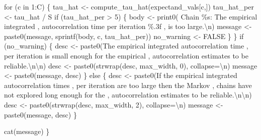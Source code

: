 \documentclass[
  letterpaper,
  DIV=11,
  numbers=noendperiod]{scrartcl}
\newenvironment{Shaded}{\begin{snugshade}}{\end{snugshade}}
\newcommand{\CharTok}[1]{\textcolor[rgb]{0.13,0.47,0.30}{#1}}
\newcommand{\ControlFlowTok}[1]{\textcolor[rgb]{0.00,0.23,0.31}{#1}}
\newcommand{\DecValTok}[1]{\textcolor[rgb]{0.68,0.00,0.00}{#1}}
\newcommand{\KeywordTok}[1]{\textcolor[rgb]{0.00,0.23,0.31}{#1}}
\newcommand{\NormalTok}[1]{\textcolor[rgb]{0.00,0.23,0.31}{#1}}
\newcommand{\OperatorTok}[1]{\textcolor[rgb]{0.37,0.37,0.37}{#1}}
\newcommand{\SpecialCharTok}[1]{\textcolor[rgb]{0.37,0.37,0.37}{#1}}
\newcommand{\StringTok}[1]{\textcolor[rgb]{0.13,0.47,0.30}{#1}}
\begin{document}
\begin{Shaded}
\begin{Highlighting}[]
  \ControlFlowTok{for}\NormalTok{ (c }\KeywordTok{in} \DecValTok{1}\NormalTok{:C) \{}
\NormalTok{    tau\_hat }\OperatorTok{\textless{}{-}}\NormalTok{ compute\_tau\_hat(expectand\_vals[c,])}
\NormalTok{    tau\_hat\_per }\OperatorTok{\textless{}{-}}\NormalTok{ tau\_hat }\OperatorTok{/}\NormalTok{ S}
    \ControlFlowTok{if}\NormalTok{ (tau\_hat\_per }\OperatorTok{\textgreater{}} \DecValTok{5}\NormalTok{) \{}
\NormalTok{      body }\OperatorTok{\textless{}{-}}\NormalTok{ print0(}\StringTok{\textquotesingle{}  Chain }\SpecialCharTok{\%s}\StringTok{: The empirical integrated \textquotesingle{}}\NormalTok{,}
                     \StringTok{\textquotesingle{}autocorrelation time per iteration }\SpecialCharTok{\%.3f}\StringTok{ \textquotesingle{}}\NormalTok{,}
                     \StringTok{\textquotesingle{}is too large.}\CharTok{\textbackslash{}n}\StringTok{\textquotesingle{}}\NormalTok{)}
\NormalTok{      message }\OperatorTok{\textless{}{-}}\NormalTok{ paste0(message, sprintf(body, c, tau\_hat\_per))}
\NormalTok{      no\_warning }\OperatorTok{\textless{}{-}}\NormalTok{ FALSE}
\NormalTok{    \}}
\NormalTok{  \}}
  \ControlFlowTok{if}\NormalTok{ (no\_warning) \{}
\NormalTok{    desc }\OperatorTok{\textless{}{-}}\NormalTok{ paste0(}\StringTok{\textquotesingle{}The empirical integrated autocorrelation time \textquotesingle{}}\NormalTok{,}
                   \StringTok{\textquotesingle{}per iteration is small enough for the empirical \textquotesingle{}}\NormalTok{,}
                   \StringTok{\textquotesingle{}autocorrelation estimates to be reliable.}\CharTok{\textbackslash{}n\textbackslash{}n}\StringTok{\textquotesingle{}}\NormalTok{)}
\NormalTok{    desc }\OperatorTok{\textless{}{-}}\NormalTok{ paste0(strwrap(desc, max\_width, }\DecValTok{0}\NormalTok{), collapse}\OperatorTok{=}\StringTok{\textquotesingle{}}\CharTok{\textbackslash{}n}\StringTok{\textquotesingle{}}\NormalTok{)}
\NormalTok{    message }\OperatorTok{\textless{}{-}}\NormalTok{ paste0(message, desc)}
\NormalTok{  \} }\ControlFlowTok{else}\NormalTok{ \{}
\NormalTok{    desc }\OperatorTok{\textless{}{-}}\NormalTok{ paste0(}\StringTok{\textquotesingle{}If the empirical integrated autocorrelation times \textquotesingle{}}\NormalTok{,}
                   \StringTok{\textquotesingle{}per iteration are too large then the Markov \textquotesingle{}}\NormalTok{,}
                   \StringTok{\textquotesingle{}chains have not explored long enough for the \textquotesingle{}}\NormalTok{,}
                   \StringTok{\textquotesingle{}autocorrelation estimates to be reliable.}\CharTok{\textbackslash{}n\textbackslash{}n}\StringTok{\textquotesingle{}}\NormalTok{)}
\NormalTok{    desc }\OperatorTok{\textless{}{-}}\NormalTok{ paste0(strwrap(desc, max\_width, }\DecValTok{2}\NormalTok{), collapse}\OperatorTok{=}\StringTok{\textquotesingle{}}\CharTok{\textbackslash{}n}\StringTok{\textquotesingle{}}\NormalTok{)}
\NormalTok{    message }\OperatorTok{\textless{}{-}}\NormalTok{ paste0(message, desc)}
\NormalTok{  \}}

\NormalTok{  cat(message)}
\NormalTok{\}}
\end{Highlighting}
\end{Shaded}
\end{document}
